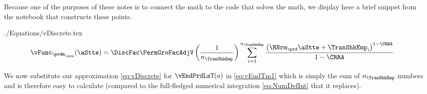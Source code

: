 \documentclass[\econtexRoot/SolvingMicroDSOPs]{subfiles}
\begin{document}
Because one of the purposes of these notes is to connect the math to the code that solves the math, we display here a brief snippet from the notebook that constructs these points.


\lstset{basicstyle=\ttfamily\footnotesize,breaklines=true,language=Python,frame=single}
\nopagebreak

\begin{verbatimwrite}{./Equations/vDiscrete.tex}
  \begin{equation}\begin{gathered}\begin{aligned}
        \vFunc_{{\prdm}_\cntn}(\aStte)  & =   \DiscFac \PermGroFacAdjV\left(\frac{1}{n_{\TranShkEmp}}\right)\sum_{i=1}^{n_{\TranShkEmp}}   \frac{\left(\RNrm_{\prd} \aStte + \TranShkEmp_{i}\right)^{1-\CRRA}}{1-\CRRA} \label{eq:vDiscrete}
      \end{aligned}\end{gathered}\end{equation}
\end{verbatimwrite}

We now substitute our approximation \eqref{eq:vDiscrete} for $\vEndPrdLsT(a)$ in \eqref{eq:vEndTm1} which is simply the sum of $n_{\TranShkEmp}$ numbers and is therefore easy to calculate (compared to the full-fledged numerical integration \eqref{eq:NumDefInt} that it replaces).

\unskip


\end{document}
